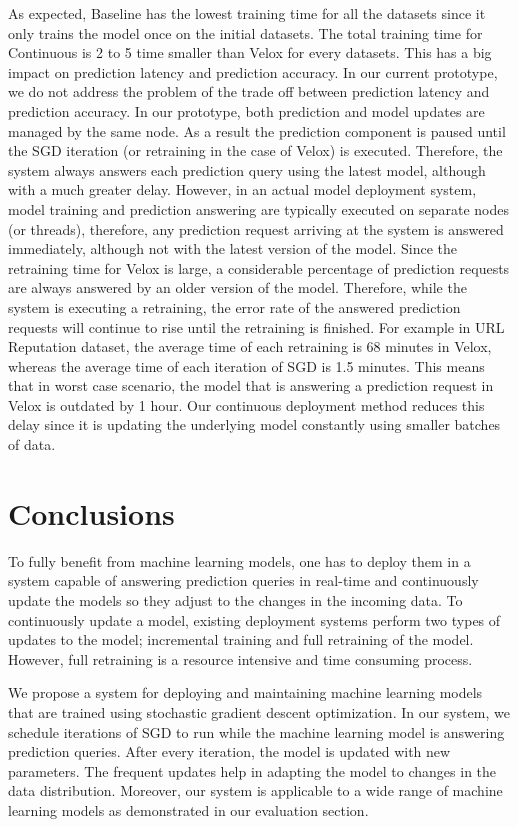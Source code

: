 \documentclass{vldb}
\begin{document}
As expected, Baseline has the lowest training time for all the datasets since it only trains the model once on the initial datasets.
The total training time for Continuous is 2 to 5 time smaller than Velox for every datasets.
This has a big impact on prediction latency and prediction accuracy.
In our current prototype, we do not address the problem of the trade off between prediction latency and prediction accuracy.
In our prototype, both prediction and model updates are managed by the same node.
As a result the prediction component is paused until the SGD iteration (or retraining in the case of Velox) is executed.
Therefore, the system always answers each prediction query using the latest model, although with a much greater delay.
However, in an actual model deployment system, model training and prediction answering are typically executed on separate nodes (or threads), therefore, any prediction request arriving at the system is answered immediately, although not with the latest version of the model.
Since the retraining time for Velox is large, a considerable percentage of prediction requests are always answered by an older version of the model.
Therefore, while the system is executing a retraining, the error rate of the answered prediction requests will continue to rise until the retraining is finished.
For example in URL Reputation dataset, the average time of each retraining is 68 minutes in Velox, whereas the average time of each iteration of SGD is 1.5 minutes.
This means that in worst case scenario, the model that is answering a prediction request in Velox is outdated by 1 hour.
Our continuous deployment method reduces this delay since it is updating the underlying model constantly using smaller batches of data.

\section{Conclusions} \label{conclusion}
To fully benefit from machine learning models, one has to deploy them in a system capable of answering prediction queries in real-time and continuously update the models so they adjust to the changes in the incoming data.
To continuously update a model, existing deployment systems perform two types of updates to the model; incremental training and full retraining of the model.
However, full retraining is a resource intensive and time consuming process.

We propose a system for deploying and maintaining machine learning models that are trained using stochastic gradient descent optimization.
In our system, we schedule iterations of SGD to run while the machine learning model is answering prediction queries.
After every iteration, the model is updated with new parameters.
The frequent updates help in adapting the model to changes in the data distribution.
Moreover, our system is applicable to a wide range of machine learning models as demonstrated in our evaluation section.
\end{document}
